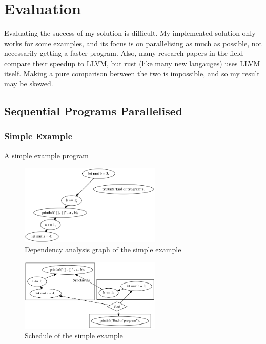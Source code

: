 \chapter{Evaluation}
\label{sec:evaluation}
 Evaluating the success of my solution is difficult. My implemented solution only works for some examples, and its focus is on parallelising as much as possible, not necessarily getting a faster program. Also, many research papers in the field compare their speedup to LLVM, but rust (like many new langauges) uses LLVM itself. Making a pure comparison between the two is impossible, and so my result may be skewed.


\section{Sequential Programs Parallelised}
\subsection{Simple Example}

\begin{code}
    \caption{A simple example program}
\end{code}

\begin{figure}[H]
    \centering
    \includegraphics[width=0.6\textwidth]{img/simple-example/main-dependency-analysis.png}
    \caption{Dependency analysis graph of the simple example}
\end{figure}

\begin{figure}[H]
    \centering
    \includegraphics[width=0.6\textwidth]{img/simple-example/main-schedule.png}
    \caption{Schedule of the simple example}
\end{figure}

